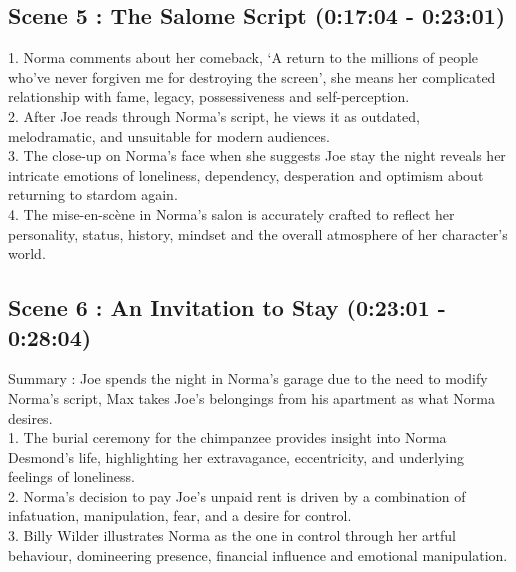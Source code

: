 \documentclass[a4paper]{article}
\begin{document}
\subsection{Scene 5 : The Salome Script (0:17:04 - 0:23:01)}
1. Norma comments about her comeback, ‘A return to the millions of people who’ve
never forgiven me for destroying the screen’, she means her complicated
relationship with fame, legacy, possessiveness and self-perception.\\
2. After Joe reads through Norma’s script, he views it as outdated, melodramatic, and
unsuitable for modern audiences.\\
3. The close-up on Norma's face when she suggests Joe stay the night reveals her
intricate emotions of loneliness, dependency, desperation and optimism about
returning to stardom again.\\
4. The mise-en-scène in Norma's salon is accurately crafted to reflect her personality,
status, history, mindset and the overall atmosphere of her character's world.\\

\subsection{Scene 6 : An Invitation to Stay (0:23:01 - 0:28:04)}
Summary : Joe spends the night in Norma's garage due to the need to modify Norma’s
script, Max takes Joe’s belongings from his apartment as what Norma desires.\\
1. The burial ceremony for the chimpanzee provides insight into Norma Desmond's life,
highlighting her extravagance, eccentricity, and underlying feelings of loneliness.\\
2. Norma's decision to pay Joe's unpaid rent is driven by a combination of infatuation,
manipulation, fear, and a desire for control.\\
3. Billy Wilder illustrates Norma as the one in control through her artful behaviour,
domineering presence, financial influence and emotional manipulation.\\
\end{document}
